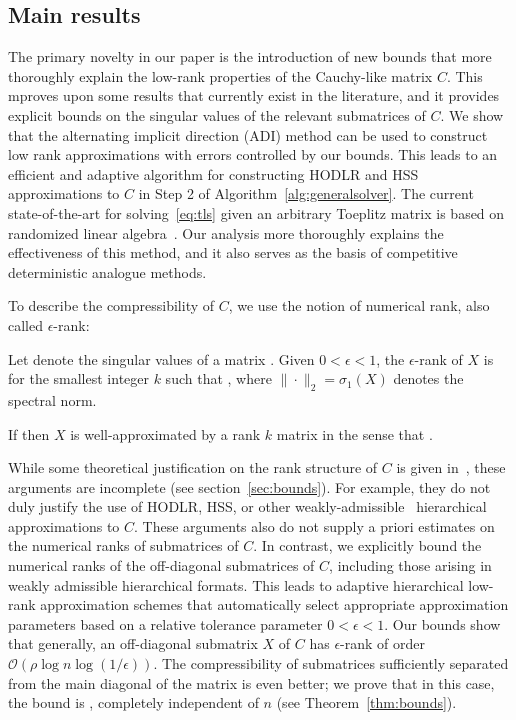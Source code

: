 \documentclass[final,reqno,onefignum,onetabnum]{siamart190516}
\newcommand{\erank}{{\rm rank}_\epsilon}
\begin{document}
\subsection{Main results}

The primary novelty in our paper is the introduction of new bounds that more thoroughly explain the low-rank properties of the Cauchy-like matrix $C$. This mproves upon some results that currently exist in the literature, and it provides explicit bounds on the singular values of the relevant submatrices of $C$. We show that the alternating implicit direction (ADI) method can be used to construct low rank approximations with errors controlled by our bounds. This leads to an efficient and adaptive algorithm for constructing HODLR and HSS approximations to $C$ in Step 2 of Algorithm~\ref{alg:generalsolver}. 
The current state-of-the-art for solving~\eqref{eq:tls} given an arbitrary Toeplitz matrix is based on randomized linear algebra~\cite{xia2012superfast}. Our analysis more thoroughly explains the effectiveness of this method, and it also serves as the basis of competitive deterministic analogue methods. 

To describe the compressibility of $C$, we use the notion of numerical rank, also called $\epsilon$-rank:
\begin{definition} 
\label{def:erank}
Let  denote the singular values of a matrix . Given $0< \epsilon < 1$, the $\epsilon$-rank of $X$  is  \smash{$\erank(X) =k$} for the smallest integer $k$ such that ,
where $\| \cdot \|_2 = \sigma_1(X)$ denotes the spectral norm. 
\end{definition}
If  \smash{$\erank(X) \leq k$} then $X$ is well-approximated by a rank $k$ matrix  in the sense that . 

While some theoretical justification on the rank structure of $C$ is given in~\cite{chandrasekaran2007superfast, martinsson2011fast}, these arguments are incomplete (see section~\ref{sec:bounds}). For example, they do not duly justify the use of HODLR, HSS, or other weakly-admissible~\cite{hackbusch2004hierarchical} hierarchical approximations to $C$.  These arguments also do not supply a priori estimates on the numerical ranks of submatrices of $C$. In contrast, we explicitly bound the numerical ranks of the off-diagonal submatrices of $C$, including those arising in weakly admissible hierarchical formats. This leads to adaptive hierarchical low-rank approximation schemes that automatically select appropriate approximation parameters based on a relative tolerance parameter $0 < \epsilon < 1$.
Our bounds show that generally, an off-diagonal submatrix $X$ of $C$ has $\epsilon$-rank of order $\mathcal{O}(\rho  \log n \log (1/\epsilon) )$.  The compressibility of submatrices sufficiently separated from the main diagonal of the matrix is even better; %
we prove that in this case, the bound is , completely independent of $n$ (see Theorem~\ref{thm:bounds}). 
\end{document}
